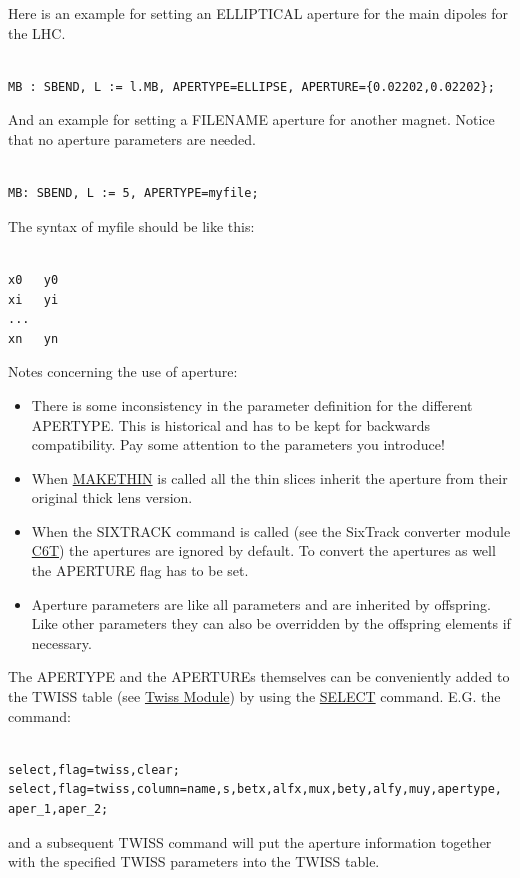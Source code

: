  Here is an example for setting an ELLIPTICAL aperture for the main dipoles for the LHC. 
\begin{verbatim}

MB : SBEND, L := l.MB, APERTYPE=ELLIPSE, APERTURE={0.02202,0.02202};
\end{verbatim} And an example for setting a FILENAME aperture for another magnet. Notice that no aperture parameters are needed. 
\begin{verbatim}

MB: SBEND, L := 5, APERTYPE=myfile;
\end{verbatim} The syntax of myfile should be like this: 
\begin{verbatim}

x0   y0
xi   yi
...
xn   yn
\end{verbatim}  Notes concerning the use of aperture: 
\begin{itemize}
	\item There is some inconsistency in the parameter definition for the different APERTYPE. This is historical and has to be kept for backwards compatibility. Pay some attention to the parameters you introduce!
	\item When \href{../makethin/makethin.html}{MAKETHIN} is called all the  thin slices inherit the aperture from their original thick lens version. 
	\item When the SIXTRACK command is called (see the SixTrack converter module \href{../c6t/c6t.html}{C6T}) the apertures are ignored by default. To convert the apertures as well the APERTURE flag has to be set. 
	\item  Aperture parameters are like all parameters and are inherited by offspring. Like other parameters they can also be overridden by the offspring elements if necessary. 
\end{itemize}  The APERTYPE and the APERTUREs themselves can be conveniently added to the TWISS table (see \href{../twiss/twiss.html}{Twiss Module}) by using the \href{select.html}{SELECT} command. E.G. the command:  
\begin{verbatim}

select,flag=twiss,clear;
select,flag=twiss,column=name,s,betx,alfx,mux,bety,alfy,muy,apertype,
aper_1,aper_2;
\end{verbatim} and a subsequent TWISS command will put the aperture information together with the specified TWISS parameters into the TWISS table.  


